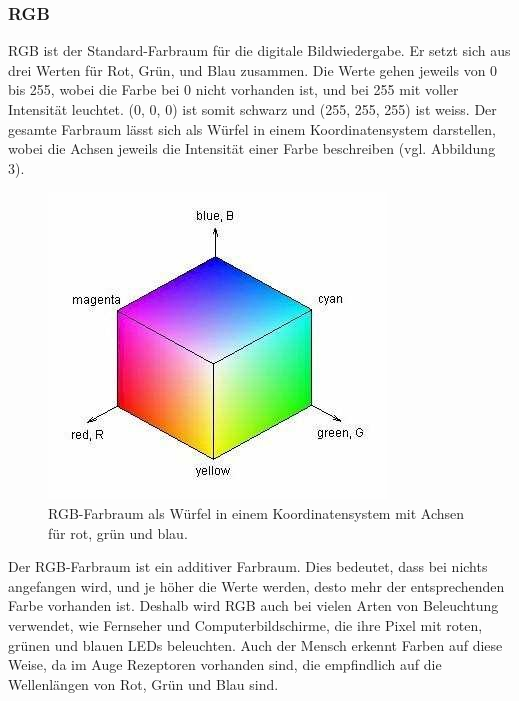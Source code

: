 \documentclass[a4paper, 12pt]{article}
\begin{document}
\subsubsection{RGB}
RGB ist der Standard-Farbraum für die digitale Bildwiedergabe. Er setzt sich aus drei Werten für Rot, Grün, und Blau zusammen. Die Werte gehen jeweils von 0 bis 255, wobei die Farbe bei 0 nicht vorhanden ist, und bei 255 mit voller Intensität leuchtet. (0, 0, 0) ist somit schwarz und (255, 255, 255) ist weiss. Der gesamte Farbraum lässt sich als Würfel in einem Koordinatensystem darstellen, wobei die Achsen jeweils die Intensität einer Farbe beschreiben (vgl. Abbildung 3).
\begin{figure}[H]
\includegraphics[scale=0.5]{RGB_Wuerfel}
\caption{RGB-Farbraum als Würfel in einem Koordinatensystem mit Achsen für rot, grün und blau. \cite{RGBBild}}
\end{figure}
\newpage
\noindent
Der RGB-Farbraum ist ein additiver Farbraum. Dies bedeutet, dass bei nichts angefangen wird, und je höher die Werte werden, desto mehr der entsprechenden Farbe vorhanden ist. \cite{RGBHSV}
\newline 
Deshalb wird RGB auch bei vielen Arten von Beleuchtung verwendet, wie Fernseher und Computerbildschirme, die ihre Pixel mit roten, grünen und blauen LEDs beleuchten. Auch der Mensch erkennt Farben auf diese Weise, da im Auge Rezeptoren vorhanden sind, die empfindlich auf die Wellenlängen von Rot, Grün und Blau sind.
\end{document}
